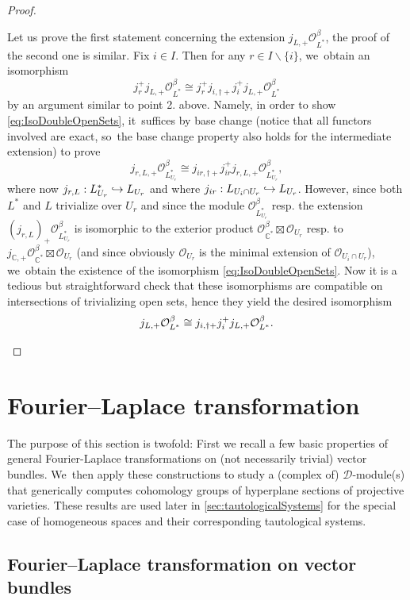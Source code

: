 \documentclass[11pt]{article}
\newcommand{\resp}{resp.\xspace}
\newcommand{\Subsection}{\subsection}
\let\mathds\mathbb
\newcommand\hto{\mathrel{\lhook\joinrel\to}}
\newcommand{\dC}{{\mathds C}}\let\C\dC
\newcommand{\cO}{\mathcal{O}}\let\O\cO
\begin{document}
\begin{proof}
\begin{enumerate}
Let us prove the first statement concerning the extension $j_{L,+}\cO_{L^*}^\beta$, the proof of the second one is similar. Fix $i\in I$. Then for any $r\in I\backslash\{i\}$, we~obtain an isomorphism
\begin{equation}\label{eq:IsoDoubleOpenSets}
j_r^+ j_{L,+} \cO^\beta_{L^{*}} \cong j_r^+ j_{i,\dag+} j_i^+ j_{L,+} \cO^\beta_{L^{*}}
\end{equation}
by an argument similar to point 2. above. Namely, in order to show \eqref{eq:IsoDoubleOpenSets}, it~suffices by base change (notice that all functors involved are exact, so~the base change property also holds for the intermediate extension) to prove
\[
j_{r,L,+} \cO_{L^*_{U_r}}^\beta \cong
j_{ir,\dag+}
j_{ir}^+
j_{r,L,+} \cO^\beta_{L_{U_r}^{*}},
\]
where now $j_{r,L}:L^*_{U_r}\hto L_{U_r}$ and where
$j_{ir}:L_{U_i\cap U_r}\hto L_{U_r}$. However, since both $L^*$ and $L$ trivialize over $U_r$ and since the module $\cO_{L_{U_r}^*}^\beta$ \resp the extension $(j_{r,L})_+\cO_{L_{U_r}^*}^\beta$ is isomorphic to the exterior product $\cO_{\dC^*}^\beta\boxtimes \cO_{U_r}$ \resp to $j_{\dC,+}\cO_{\dC^*}^\beta\boxtimes \cO_{U_r}$ (and since obviously
$\cO_{U_r}$ is the minimal extension of $\cO_{U_i\cap U_r}$), we~obtain the existence of the isomorphism \eqref{eq:IsoDoubleOpenSets}. Now it is a tedious but straightforward check that these isomorphisms are compatible on intersections of trivializing open sets, hence they yield the desired isomorphism
\[
j_{L,+} \cO^\beta_{L^{*}} \cong j_{i,\dag+} j_i^+ j_{L,+} \cO^\beta_{L^{*}}.\qedhere
\]
\end{enumerate}
\end{proof}

\section{Fourier--Laplace transformation} \label{sec:FLOnVecBundles}

The purpose of this section is twofold: First we recall a few basic properties of general Fourier-Laplace transformations on (not necessarily trivial) vector bundles. We~then apply these constructions to study a (complex of) $\mathscr{D}$\nobreakdash-mod\-ule(s) that generically computes cohomology groups of hyperplane sections of projective varieties. These results are used later in \cref{sec:tautologicalSystems} for the special case of
homogeneous spaces and their corresponding tautological systems.

\Subsection{Fourier--Laplace transformation on vector bundles} \label{ssec:FLBasics}
\end{document}

